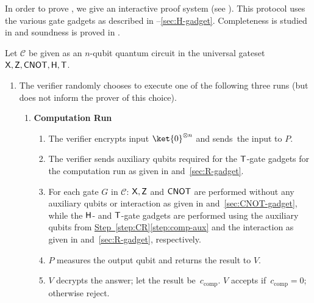 \documentclass{toc}
\newcommand{\hgate}{{\sf H}}
\newcommand{\rgate}{{\sf T}}
\newcommand{\xgate}{{\sf X}}
\newcommand{\zgate}{{\sf Z}}
\newcommand{\cnot}{{\sf CNOT}}
\newcommand{\cC}{\mathcal{C}}
\newcommand{\stepref}[2]{\hyperref[#2]{Step~\ref{#1}\ref{#2}}}
\begin{document}
In order to prove , we give   an interactive proof system (see \textbf{}).
This protocol uses the various gate gadgets as described in --\ref{sec:H-gadget}. Completeness is  studied in  and soundness is proved in .
%

\begin{proof-system} \caption{\label{prot:interactive-proof} Verifiable quantum computation with trusted auxiliary states}
Let $\mathcal{C}$ be given as an $n$-qubit quantum circuit in the universal gateset $\xgate, \zgate, \cnot, \hgate, \rgate$.

\begin{enumerate}
\item %
The verifier randomly chooses to execute one of the following three runs (but does not inform the prover of this choice).

\begin{enumerate}[label=\Alph*.]
\item   \textbf{Computation Run}\label{step:CR}
\begin{enumerate}[label*=\arabic*.,ref=\arabic*]
\item The verifier encrypts input $\ket{0}^{\otimes n}$ %
and sends~the input to $P$.
\item \label{step:comp-aux}The verifier sends auxiliary qubits required for the $\rgate$-gate gadgets for the computation run as given in  and~\ref{sec:R-gadget}.
\item For each gate $G$ in  $\cC$:  $\xgate, \zgate$ and $\cnot$ are performed without any auxiliary qubits or interaction as given in  and~\ref{sec:CNOT-gadget}, while the $\hgate$- and $\rgate$-gate gadgets are performed using the auxiliary qubits from \stepref{step:CR}{step:comp-aux} and the interaction as given in  and~\ref{sec:R-gadget}, respectively.
\item $P$ measures the output qubit and returns the result to $V$.
\item $V$ decrypts the answer; let the result be~$c_{\text{comp}}$. $V$ accepts if~$c_{\text{comp}}=0$; otherwise reject.
\end{enumerate}


\end{enumerate}
\end{enumerate}
\end{proof-system}
\end{document}
